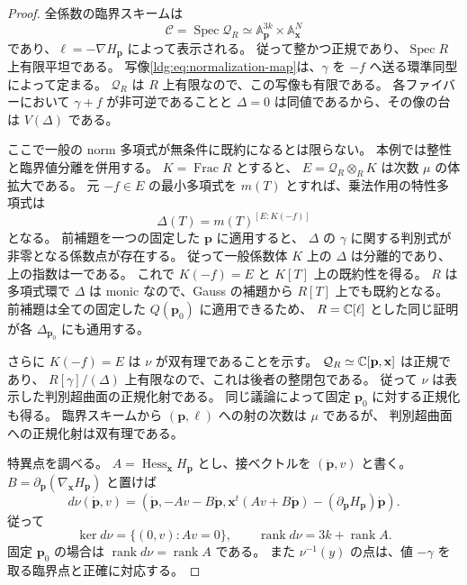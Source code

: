 \begin{proof}
全係数の臨界スキームは
\[
 \mathscr C=\operatorname{Spec}\mathcal Q_R
    \simeq\mathbb A^{3k}_{\mathbf p}\times\mathbb A^N_{\mathbf x}
\]
であり、$\ell=-\nabla H_{\mathbf p}$ によって表示される。
従って整かつ正規であり、$\operatorname{Spec}R$ 上有限平坦である。
写像\eqref{ldg:eq:normalization-map}は、$\gamma$ を $-f$ へ送る環準同型によって定まる。
$\mathcal Q_R$ は $R$ 上有限なので、この写像も有限である。
各ファイバーにおいて $\gamma+f$ が非可逆であることと
$\Delta=0$ は同値であるから、その像の台は $V(\Delta)$ である。

ここで一般の norm 多項式が無条件に既約になるとは限らない。
本例では整性と臨界値分離を併用する。
$K=\operatorname{Frac}R$ とすると、
$E=\mathcal Q_R\otimes_RK$ は次数 $\mu$ の体拡大である。
元 $-f\in E$ の最小多項式を $m(T)$ とすれば、乗法作用の特性多項式は
\[
 \Delta(T)=m(T)^{[E:K(-f)]}
\]
となる。
前補題を一つの固定した $\mathbf p$ に適用すると、
$\Delta$ の $\gamma$ に関する判別式が非零となる係数点が存在する。
従って一般係数体 $K$ 上の $\Delta$ は分離的であり、上の指数は一である。
これで $K(-f)=E$ と $K[T]$ 上の既約性を得る。
$R$ は多項式環で $\Delta$ は monic なので、Gauss の補題から
$R[T]$ 上でも既約となる。
前補題は全ての固定した $Q(\mathbf p_0)$ に適用できるため、
$R=\mathbb C[\ell]$ とした同じ証明が各 $\Delta_{\mathbf p_0}$ にも通用する。

さらに $K(-f)=E$ は $\nu$ が双有理であることを示す。
$\mathcal Q_R\simeq\mathbb C[\mathbf p,\mathbf x]$ は正規であり、
$R[\gamma]/(\Delta)$ 上有限なので、これは後者の整閉包である。
従って $\nu$ は表示した判別超曲面の正規化射である。
同じ議論によって固定 $\mathbf p_0$ に対する正規化も得る。
臨界スキームから $(\mathbf p,\ell)$ への射の次数は $\mu$ であるが、
判別超曲面への正規化射は双有理である。

特異点を調べる。
$A=\operatorname{Hess}_{\mathbf x}H_{\mathbf p}$ とし、接ベクトルを
$(\dot{\mathbf p},v)$ と書く。
$B=\partial_{\mathbf p}(\nabla_{\mathbf x}H_{\mathbf p})$ と置けば
\[
 d\nu(\dot{\mathbf p},v)=
 \left(\dot{\mathbf p},
       -Av-B\dot{\mathbf p},
       \mathbf x^t(Av+B\dot{\mathbf p})
           -(\partial_{\mathbf p}H_{\mathbf p})\dot{\mathbf p}\right).
\]
従って
\begin{equation}\label{ldg:eq:normalization-differential}
 \ker d\nu=\{(0,v):Av=0\},\qquad
 \operatorname{rank}d\nu=3k+\operatorname{rank}A.
\end{equation}
固定 $\mathbf p_0$ の場合は $\operatorname{rank}d\nu=\operatorname{rank}A$ である。
また $\nu^{-1}(y)$ の点は、値 $-\gamma$ を取る臨界点と正確に対応する。


\end{proof}
